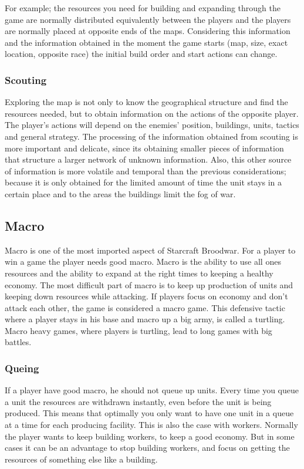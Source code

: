 				For example; the resources you need for building and expanding through the game are normally distributed
				equivalently between the players and the players are normally placed at opposite ends of the maps. 
				Considering this information and the information obtained in the moment the game starts 
				(map, size, exact location, opposite race) the initial build order and start actions can change. 
		
			\subsubsection{Scouting}
				Exploring the map is not only to know the geographical structure and find the resources needed, 
				but to obtain information on the actions of the opposite player. The player's actions will depend on
				the enemies' position, buildings, units, tactics and general strategy. The processing of the information 
				obtained from scouting is more important and delicate, since its obtaining smaller pieces of information 
				that structure a larger network of unknown information. Also, this other source of information 
				is more volatile and temporal than the previous considerations; because it is only obtained for the 
				limited amount of time the unit stays in a certain place and to the areas the buildings limit the fog of war.
				
	\subsection{Macro}
		Macro is one of the most imported aspect of Starcraft Broodwar. For a player to win a game the player needs good macro. 
		Macro is the ability to use all ones resources and the ability to expand at the right times to keeping a healthy economy.
		The most difficult part of macro is to keep up production of units and keeping down resources while attacking.
		If players focus on economy and don't attack each other, the game is considered a macro game. This defensive tactic where a
		player stays in his base and macro up a big army, is called a turtling. Macro heavy games, where players is turtling, lead to
		long games with big battles. 
			
			\subsubsection{Queing}
				If a player have good macro, he should not queue up units. 
				Every time you queue a unit the resources are withdrawn instantly, even before 
				the unit is being produced. This means that optimally you only want to have one unit in a queue at a time for each producing facility.
				This is also the case with workers. Normally the player wants to keep building workers, to keep a good economy.
				But in some cases it can be an advantage to stop building workers, and focus on getting the resources of something else like a building.
				
